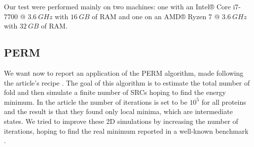 Our test were performed mainly on two machines: one with an Intel® Core i7-7700 @ $3.6 \ GHz$ with $16 \ GB$ of RAM and one on an AMD® Ryzen 7 @ $3.6 \ GHz$ with $32 \ GB$ of RAM.
\subsection{PERM}
We want now to report an application of the PERM algorithm, made following the article's recipe \cite{PERM}.
The goal of this algorithm is to estimate the total number of fold and then simulate a finite number of SRCs hoping to find the energy minimum.
In the article the number of iterations is set to be $10^5$ for all proteins and the result is that they found only local minima, which are intermediate states.
We tried to improve these 2D simulations by increasing the number of iterations, hoping to find the real minimum reported in a well-known benchmark \cite{bench}.


